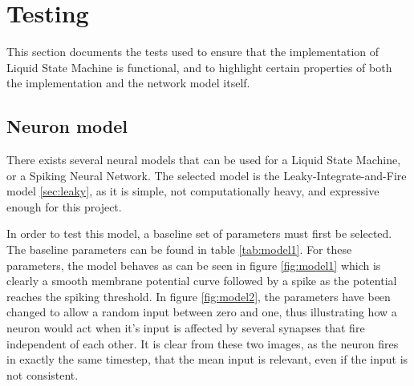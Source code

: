\chapter{Testing}

This section documents the tests used to ensure that the implementation of Liquid State Machine is functional, and to highlight certain properties of both the implementation and the network model itself.

\section{Neuron model}

There exists several neural models that can be used for a Liquid State Machine, or a Spiking Neural Network. The selected model is the Leaky-Integrate-and-Fire model \ref{sec:leaky}, as it is simple, not computationally heavy, and expressive enough for this project.

In order to test this model, a baseline set of parameters must first be selected. The baseline parameters can be found in table \ref{tab:model1}. For these parameters, the model behaves as can be seen in figure \ref{fig:model1} which is clearly a smooth membrane potential curve followed by a spike as the potential reaches the spiking threshold. In figure \ref{fig:model2}, the parameters have been changed to allow a random input between zero and one, thus illustrating how a neuron would act when it's input is affected by several synapses that fire independent of each other. It is clear from these two images, as the neuron fires in exactly the same timestep, that the mean input is relevant, even if the input is not consistent.


